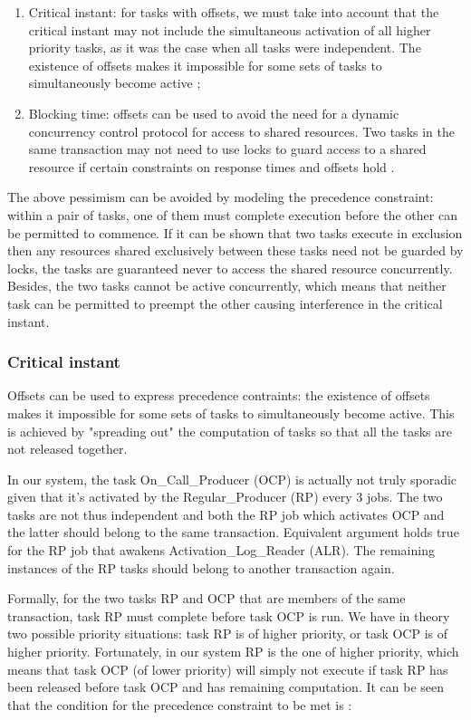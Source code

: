 \documentclass{article}
\begin{document}
\begin{enumerate}
   \item Critical instant: for tasks with offsets, we must take into account that the critical instant may not include the simultaneous activation of all higher priority tasks, as it was the case when all tasks were independent. The existence of offsets makes it impossible for some sets of tasks to simultaneously become active \cite{pessimistic-rma};
   \item Blocking time: offsets can be used to avoid the need for a dynamic concurrency control protocol for access to shared resources. Two tasks in the same transaction may not need to use locks to guard access to a shared resource if certain constraints on response times and offsets hold \cite{tindell-offsets}.
\end{enumerate}

The above pessimism can be avoided by modeling the precedence constraint: within a pair of tasks, one of them must complete execution before the other can be permitted to commence. If it can be shown that two tasks execute in exclusion then any resources shared exclusively between these tasks need not be guarded by locks, the tasks are guaranteed never to access the shared resource concurrently. Besides, the two tasks cannot be active concurrently, which means that neither task can be permitted to preempt the other causing interference in the critical instant.

\subsubsection{Critical instant}

Offsets can be used to express precedence contraints: the existence of offsets makes it impossible for some sets of tasks to simultaneously become active. This is achieved by "spreading out" the computation of tasks so that all the tasks are not released together.

In our system, the task On\_Call\_Producer (OCP) is actually not truly sporadic given that it's activated by the Regular\_Producer (RP) every 3 jobs. The two tasks are not thus independent and both the RP job which activates OCP and the latter should belong to the same transaction. Equivalent argument holds true for the RP job that awakens Activation\_Log\_Reader (ALR). The remaining instances of the RP tasks should belong to another transaction again.

Formally, for the two tasks RP and OCP that are members of the same transaction, task RP must complete before task OCP is run. We have in theory two possible priority situations: task RP is of higher priority, or task OCP is of higher priority. Fortunately, in our system RP is the one of higher priority, which means that task OCP (of lower priority) will simply not execute if task RP has been released before task OCP and has remaining computation. It can be seen that the condition for the precedence constraint to be met is \cite{tindell-offsets}:
\end{document}

